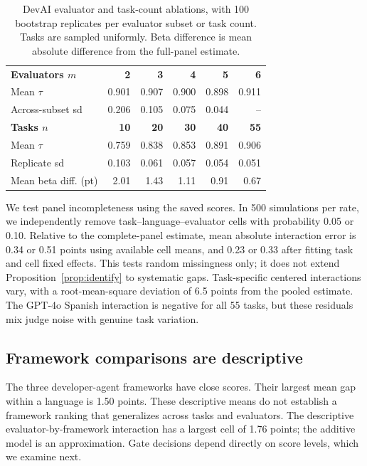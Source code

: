 \documentclass[sigconf,anonymous]{aamas}
\begin{document}
\begin{table}[t]\centering\small
\setlength{\tabcolsep}{3pt}
\caption{DevAI evaluator and task-count ablations, with 100 bootstrap
replicates per evaluator subset or task count. Tasks are sampled uniformly.
Beta difference is mean absolute difference from the full-panel estimate.}
\label{tab:ablations}
\begin{tabular*}{\columnwidth}{@{\extracolsep{\fill}}lrrrrr@{}}\toprule
\textbf{Evaluators $m$} & \textbf{2} & \textbf{3} & \textbf{4} & \textbf{5} & \textbf{6}\\
Mean $\tau$ & 0.901 & 0.907 & 0.900 & 0.898 & 0.911\\
Across-subset sd & 0.206 & 0.105 & 0.075 & 0.044 & --\\\midrule
\textbf{Tasks $n$} & \textbf{10} & \textbf{20} & \textbf{30} & \textbf{40} & \textbf{55}\\
Mean $\tau$ & 0.759 & 0.838 & 0.853 & 0.891 & 0.906\\
Replicate sd & 0.103 & 0.061 & 0.057 & 0.054 & 0.051\\
Mean beta diff. (pt) & 2.01 & 1.43 & 1.11 & 0.91 & 0.67\\
\bottomrule\end{tabular*}
\end{table}

We test panel incompleteness using the saved scores. In 500 simulations per rate,
we independently remove task--language--evaluator cells with probability
0.05 or 0.10. Relative to the complete-panel estimate, mean absolute
interaction error is 0.34 or 0.51 points using available cell means,
and 0.23 or 0.33 after fitting task and cell fixed effects. This tests
random missingness only; it does not extend Proposition~\ref{prop:identify}
to systematic gaps. Task-specific centered interactions vary, with a
root-mean-square deviation of 6.5 points from the pooled estimate.
The GPT-4o Spanish interaction is negative for all 55 tasks, but these
residuals mix judge noise with genuine task variation.

\subsection{Framework comparisons are descriptive}

The three developer-agent frameworks have close scores. Their largest mean
gap within a language is 1.50 points. These descriptive means do not establish
a framework ranking that generalizes across tasks and evaluators.
The descriptive evaluator-by-framework interaction has a largest
cell of 1.76 points; the additive
model is an approximation. Gate decisions depend directly on score levels,
which we examine next.
\end{document}
